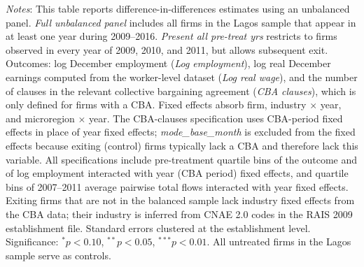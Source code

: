 \begin{table}[H]
\begin{minipage}{\textwidth}
\textit{Notes}: This table reports difference-in-differences estimates using an unbalanced panel. \textit{Full unbalanced panel} includes all firms in the Lagos sample that appear in at least one year during 2009--2016. \textit{Present all pre-treat yrs} restricts to firms observed in every year of 2009, 2010, and 2011, but allows subsequent exit. Outcomes: log December employment (\textit{Log employment}), log real December earnings computed from the worker-level dataset (\textit{Log real wage}), and the number of clauses in the relevant collective bargaining agreement (\textit{CBA clauses}), which is only defined for firms with a CBA. Fixed effects absorb firm, industry $\times$ year, and microregion $\times$ year. The CBA-clauses specification uses CBA-period fixed effects in place of year fixed effects; \textit{mode\_base\_month} is excluded from the fixed effects because exiting (control) firms typically lack a CBA and therefore lack this variable. All specifications include pre-treatment quartile bins of the outcome and of log employment interacted with year (CBA period) fixed effects, and quartile bins of 2007--2011 average pairwise total flows interacted with year fixed effects. Exiting firms that are not in the balanced sample lack industry fixed effects from the CBA data; their industry is inferred from CNAE 2.0 codes in the RAIS 2009 establishment file. Standard errors clustered at the establishment level. Significance: $^{*}p{<}0.10$, $^{**}p{<}0.05$, $^{***}p{<}0.01$. All untreated firms in the Lagos sample serve as controls.
\end{minipage}
\end{table}

